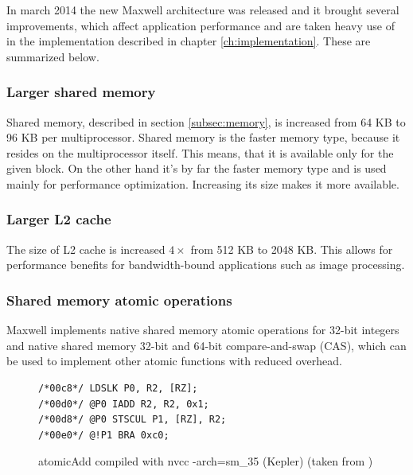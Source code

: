 In march 2014 the new Maxwell architecture was released and it brought several improvements, which affect application performance and are taken heavy use of in the implementation described in chapter \ref{ch:implementation}. These are summarized below.

\subsubsection{Larger shared memory}

Shared memory, described in section \ref{subsec:memory}, is increased from 64 KB to 96 KB per multiprocessor. Shared memory is the faster memory type, because it resides on the multiprocessor itself. This means, that it is available only for the given block. On the other hand it's by far the faster memory type and is used mainly for performance optimization. Increasing its size makes it more available.

\FloatBarrier

\subsubsection{Larger L2 cache}

The size of L2 cache is increased $4 \times$ from 512 KB to 2048 KB. This allows for performance benefits for bandwidth-bound applications such as image processing.

\subsubsection{Shared memory atomic operations}\label{subsubsec:maxwell-shared-memory}

Maxwell implements native shared memory atomic operations for 32-bit integers and native shared memory 32-bit and 64-bit compare-and-swap (CAS), which can be used to implement other atomic functions with reduced overhead.

\begin{figure}
\begin{verbatim}
/*00c8*/ LDSLK P0, R2, [RZ];                          
/*00d0*/ @P0 IADD R2, R2, 0x1;                            
/*00d8*/ @P0 STSCUL P1, [RZ], R2;                         
/*00e0*/ @!P1 BRA 0xc0;                                   
\end{verbatim}
\caption{atomicAdd compiled with nvcc -arch=sm\_35 (Kepler) (taken from \cite{first-experience-maxwell})}
\label{code:atomic-add-kepler}
\end{figure}

